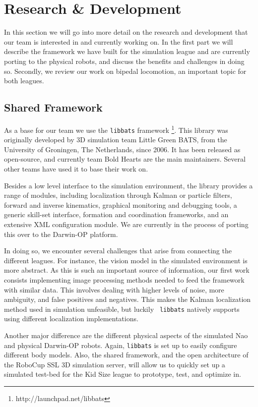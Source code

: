 \documentclass{llncs}
\begin{document}
\section{Research \& Development}
\label{sec:research}

In this section we will go into more detail on the research and
development that our team is interested in and currently working
on. In the first part we will describe the framework we have built for
the simulation league and are currently porting to the physical
robots, and discuss the benefits and challenges in doing so. Secondly,
we review our work on bipedal locomotion, an important topic for both
leagues.

\subsection{Shared Framework}
\label{sec:framework}

As a base for our team we use the {\tt libbats} framework
\footnote{http://launchpad.net/libbats}. This library was originally
developed by 3D simulation team Little Green BATS, from the University
of Groningen, The Netherlands, since 2006. It has been released as
open-source, and currently team Bold Hearts are the main
maintainers. Several other teams have used it to base their work on.

Besides a low level interface to the simulation environment, the
library provides a range of modules, including localization through
Kalman or particle filters, forward and inverse kinematics, graphical
monitoring and debugging tools, a generic skill-set interface,
formation and coordination frameworks, and an extensive XML
configuration module. We are currently in the process of porting this
over to the Darwin-OP platform.

In doing so, we encounter several challenges that arise from
connecting the different leagues. For instance, the vision model in
the simulated environment is more abstract. As this is such an
important source of information, our first work consists implementing
image processing methods needed to feed the framework with similar
data. This involves dealing with higher levels of noise, more
ambiguity, and false positives and negatives. This makes the Kalman
localization method used in simulation unfeasible, but luckily {\tt
  libbats} natively supports using different localization
implementations.

Another major difference are the different physical aspects of the
simulated Nao and physical Darwin-OP robots. Again, {\tt libbats} is
set up to easily configure different body models. Also, the shared
framework, and the open architecture of the RoboCup SSL 3D simulation
server, will allow us to quickly set up a simulated test-bed for the
Kid Size league to prototype, test, and optimize in.
\end{document}
